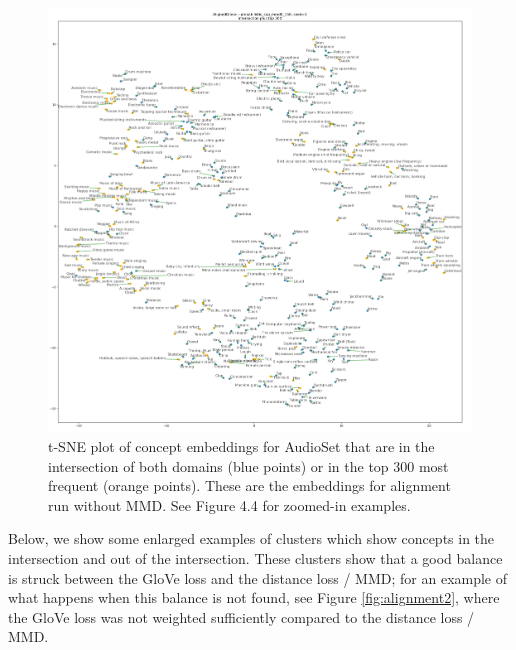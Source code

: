 \begin{figure}[H]
    \centering
    \includegraphics[width=\textwidth]{images/results/intersection_top300_tsne_audioset_probabilistic_sup_mmd0_150_AlignedGlove_1.png}
    \caption{
        t-SNE plot of concept embeddings for AudioSet that are in the intersection of both domains (blue points) or in the top 300 most frequent (orange points). These are the embeddings for alignment run without MMD. See Figure 4.4 for zoomed-in examples. 
    }
\end{figure}

Below, we show some enlarged examples of clusters which show concepts in the intersection and out of the intersection. These clusters show that a good balance is struck between the GloVe loss and the distance loss / MMD; for an example of what happens when this balance is not found, see Figure \ref{fig:alignment2}, where the GloVe loss was not weighted sufficiently compared to the distance loss / MMD. 


